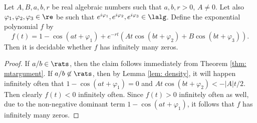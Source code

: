 \begin{lemma}\label{lem: oneOscOneRep}
Let $A, B, a, b, r$ be real algebraic numbers such that 
$a, b, r > 0$,  $A \neq 0$.
Let also $\varphi_1,\varphi_2,\varphi_3\in\re$ be
such that
$e^{i\varphi_1},e^{i\varphi_2},e^{i\varphi_3}\in\lalg$.  
Define the exponential polynomial $f$ by
\[
f(t) = 1-\cos(at + \varphi_1)
+ e^{-rt}(At\cos(bt + \varphi_2) + B\cos(bt+\varphi_3)).
\]
Then it is decidable whether $f$ has infinitely many
zeros. 
\end{lemma}
\begin{proof}
If $a/b\in\rats$, then the claim follows immediately from Theorem
\ref{thm: mtargument}. If $a/b\not\in\rats$, then by Lemma \ref{lem: density},
it will happen infinitely often that $1-\cos(at+\varphi_1) = 0$ and
$At\cos(bt+\varphi_2) < -|A|t/2$. Then clearly $f(t) < 0$ infinitely often.
Since $f(t)>0$ infinitely often as well, due to the non-negative dominant
term $1-\cos(at+\varphi_1)$, it follows that $f$ has infinitely many zeros.
\end{proof}














